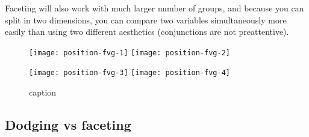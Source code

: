 Faceting will also work with much larger number of groups, and because you can split in two dimensions, you can compare two variables simultaneously more easily than using two different aesthetics (conjunctions are not preattentive).

\begin{figure}[htbp]
  \centering
    \texttt{[image: position-fvg-1]}%
    \texttt{[image: position-fvg-2]}

    \texttt{[image: position-fvg-3]}%
    \texttt{[image: position-fvg-4]}
  \caption{caption}
  \label{fig:facet-vs-groups}
\end{figure}


\subsection{Dodging vs faceting}
\label{sub:dodging_vs_faceting}



% 
% 
% 
% 
% 
% 


